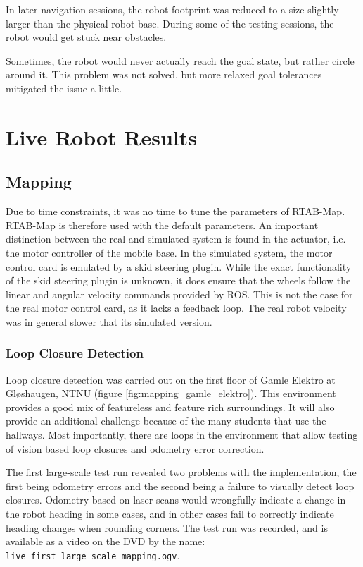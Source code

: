 In later navigation sessions, the robot footprint was reduced to a size slightly larger than the physical robot base. During some of the testing sessions, the robot would get stuck near obstacles. 

Sometimes, the robot would never actually reach the goal state, but rather circle around it. This problem was not solved, but more relaxed goal tolerances mitigated the issue a little. 

\section{Live Robot Results}

\subsection{Mapping}

Due to time constraints, it was no time to tune the parameters of \ac{RTAB-Map}. \ac{RTAB-Map} is therefore used with the default parameters. An important distinction between the real and simulated system is found in the actuator, i.e. the motor controller of the mobile base. In the simulated system, the motor control card is emulated by a skid steering plugin. While the exact functionality of the skid steering plugin is unknown, it does ensure that the wheels follow the linear and angular velocity commands provided by \ac{ROS}. This is not the case for the real motor control card, as it lacks a feedback loop. The real robot velocity was in general slower that its simulated version.

\subsubsection{Loop Closure Detection}

Loop closure detection was carried out on the first floor of Gamle Elektro at Gløshaugen, NTNU (figure \ref{fig:mapping_gamle_elektro}). This environment provides a good mix of featureless and feature rich surroundings. It will also provide an additional challenge because of the many students that use the hallways. Most importantly, there are loops in the environment that allow testing of vision based loop closures and odometry error correction. 

The first large-scale test run revealed two problems with the implementation, the first being odometry errors and the second being a failure to visually detect loop closures. Odometry based on laser scans would wrongfully indicate a change in the robot heading in some cases, and in other cases fail to correctly indicate heading changes when rounding corners. The test run was recorded, and is available as a video on the DVD by the name: \texttt{live\_first\_large\_scale\_mapping.ogv}.

